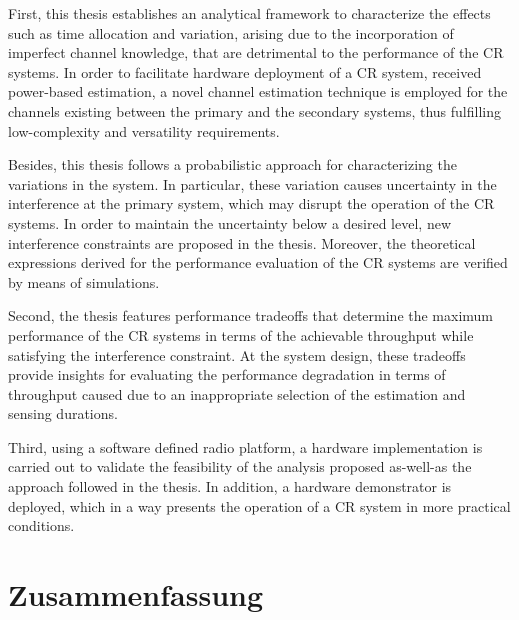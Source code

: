 First, this thesis establishes an analytical framework to characterize the effects such as time allocation and variation, arising due to the incorporation of imperfect channel knowledge, that are detrimental to the performance of the CR systems. In order to facilitate hardware deployment of a CR system, received power-based estimation, a novel channel estimation technique is employed for the channels existing between the primary and the secondary systems, thus fulfilling low-complexity and versatility requirements. 

Besides, this thesis follows a probabilistic approach for characterizing the variations in the system. In particular, these variation causes uncertainty in the interference at the primary system, which may disrupt the operation of the CR systems. In order to maintain the uncertainty below a desired level, new interference constraints are proposed in the thesis. Moreover, the theoretical expressions derived for the performance evaluation of the CR systems are verified by means of simulations. 




Second, the thesis features performance tradeoffs that determine the maximum performance of the CR systems in terms of the achievable throughput while satisfying the interference constraint. At the system design, these tradeoffs provide insights for evaluating the performance degradation in terms of throughput caused due to an inappropriate selection of the estimation and sensing durations. 

Third, using a software defined radio platform, a hardware implementation is carried out to validate the feasibility of the analysis proposed as-well-as the approach followed in the thesis. In addition, a hardware demonstrator is deployed, which in a way presents the operation of a CR system in more practical conditions. %



\cleardoublepage
\chapter*{Zusammenfassung}


\cleardoublepage
